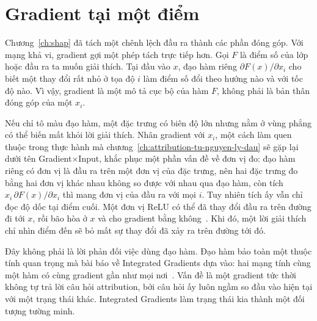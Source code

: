 \section{Gradient tại một điểm}
\label{sec:ch05-gradient-tai-mot-diem}

Chương~\ref{ch:shap} đã tách một chênh lệch đầu ra thành các phần đóng góp.
Với mạng khả vi, gradient gợi một phép tách trực tiếp hơn. Gọi $F$ là điểm số
của lớp hoặc đầu ra ta muốn giải thích. Tại đầu vào $x$, đạo hàm riêng
$\partial F(x)/\partial x_i$ cho biết một thay đổi rất nhỏ ở tọa độ $i$ làm
điểm số đổi theo hướng nào và với tốc độ nào. Vì vậy, gradient là một mô tả cục bộ của hàm $F$, không phải là bản thân
đóng góp của một  $x_i$.

Nếu chỉ tô màu đạo hàm, một đặc trưng có biên độ lớn nhưng nằm ở vùng phẳng có
thể biến mất khỏi lời giải thích. Nhân gradient với $x_i$, một cách làm quen thuộc trong thực hành mà
chương~\ref{ch:attribution-tu-nguyen-ly-dau} sẽ gặp lại dưới tên
Gradient$\mathbin{\times}$Input, khắc
phục một phần vấn đề về đơn vị đo: đạo hàm riêng có đơn vị là đầu ra trên một
đơn vị của đặc trưng, nên hai đặc trưng đo bằng hai đơn vị khác nhau không so
được với nhau qua đạo hàm, còn tích $x_i\,\partial F(x)/\partial x_i$ thì mang
đơn vị của đầu ra với mọi $i$. Tuy nhiên tích ấy vẫn chỉ đọc độ dốc tại điểm
cuối. Một đơn vị ReLU có
thể đã thay đổi đầu ra trên đường đi tới $x$, rồi bão hòa ở $x$ và cho gradient
bằng không~\autocite{p11ig}. Khi đó, một lời giải thích chỉ nhìn điểm đến sẽ bỏ mất sự thay đổi đã xảy ra
trên đường tới đó.

Đây không phải là lời phản đối việc dùng đạo hàm. Đạo hàm bảo toàn một thuộc
tính quan trọng mà bài báo về Integrated Gradients dựa vào: hai mạng tính cùng
một hàm có cùng gradient gần như mọi nơi~\autocite{p11ig}.
Vấn đề là một gradient tức thời không tự trả lời câu hỏi attribution, bởi câu
hỏi ấy luôn ngầm so đầu vào hiện tại với một trạng thái khác. Integrated
Gradients làm trạng thái kia thành một đối tượng tường minh.

%
%
